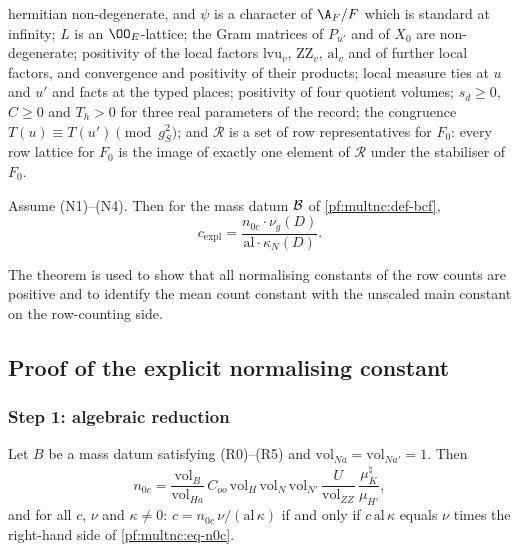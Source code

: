 \begin{hypothesis}
\begin{enumerate}[label=(N\arabic*)]
hermitian non-degenerate, and $\psi$ is a character of $\A_F/F$ which is standard at infinity; $L$ is an $\OO_E$-lattice;
the Gram matrices of $P_{u'}$ and of $X_0$ are non-degenerate; positivity of the local factors $\mathrm{lvu}_v$,
$\mathrm{ZZ}_v$, $\mathrm{al}_v$ and of further local factors, and convergence and positivity of their products; local
measure ties at $u$ and $u'$ and facts at the typed places; positivity of four quotient volumes; $s_d\ge0$, $C\ge0$ and
$T_h>0$ for three real parameters of the record; the congruence $T(u)\equiv T(u')\pmod{g_S^2}$; and $\mathcal R$ is a set of
row representatives for $F_0$: every row lattice for $F_0$ is the image of exactly one element of $\mathcal R$ under the
stabiliser of $F_0$.
\end{enumerate}
\end{hypothesis}

\begin{theorem}\label{pf:multnc:main-nc}
Assume (N1)--(N4). Then for the mass datum $\mathcal{B}$ of \cref{pf:multnc:def-bcf},
\begin{equation}\label{pf:multnc:eq-nctiec}
c_{\mathrm{expl}}=\frac{n_{0c}\cdot\nu_g(D)}{\mathrm{al}\cdot\kappa_N(D)}.
\end{equation}
\end{theorem}

The theorem is used to show that all normalising constants of the row counts are positive and to identify the mean count
constant with the unscaled main constant on the row-counting side.

\subsection{Proof of the explicit normalising constant}\label{pf:multnc:sec-ncpf}

\subsubsection*{Step 1: algebraic reduction}

\begin{lemma}\label{pf:multnc:ncalg}
Let $B$ be a mass datum satisfying (R0)--(R5) and $\mathrm{vol}_{Na}=\mathrm{vol}_{Na'}=1$. Then
\begin{equation}\label{pf:multnc:eq-n0c}
n_{0c}=\frac{\mathrm{vol}_B}{\mathrm{vol}_{Ha}}\,C_{oo}\,\mathrm{vol}_H\,\mathrm{vol}_N\,\mathrm{vol}_{N'}\,
\frac{U}{\mathrm{vol}_{ZZ}}\,\frac{\mu_K^\natural}{\mu_{H'}},
\end{equation}
and for all $c$, $\nu$ and $\kappa\ne0$: $c=n_{0c}\,\nu/(\mathrm{al}\,\kappa)$ if and only if $c\,\mathrm{al}\,\kappa$
equals $\nu$ times the right-hand side of \eqref{pf:multnc:eq-n0c}.
\end{lemma}


